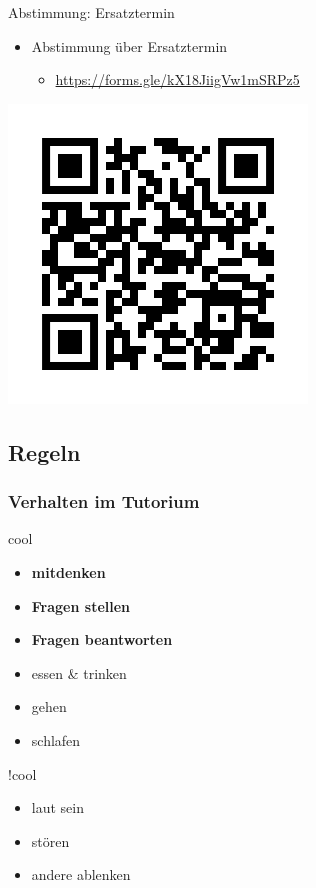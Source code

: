 \documentclass[18pt]{beamer}
\begin{document}
\begin{frame}{Abstimmung: Ersatztermin}
	\begin{itemize}
		\item Abstimmung über Ersatztermin
		\begin{itemize}
			\item \url{https://forms.gle/kX18JiigVw1mSRPz5}
		\end{itemize}
	\end{itemize}
		\centering
		\includegraphics[scale=0.65]{pics/tut0/frame.png}
\end{frame}
		
	\subsection{Regeln}
		\begin{frame}
			\frametitle{Verhalten im Tutorium}
			\begin{block}{cool}
				\begin{itemize}
					\item \textbf{mitdenken}
					\item \textbf{Fragen stellen}
					\item \textbf{Fragen beantworten}
					\item essen \& trinken
					\item gehen
					\item schlafen
				\end{itemize}
			\end{block}
			\pause
			\begin{block}{!cool}
				\begin{itemize}
					\item laut sein
					\item stören
					\item andere ablenken
				\end{itemize}
			\end{block}
		\end{frame}
		
\end{document}
